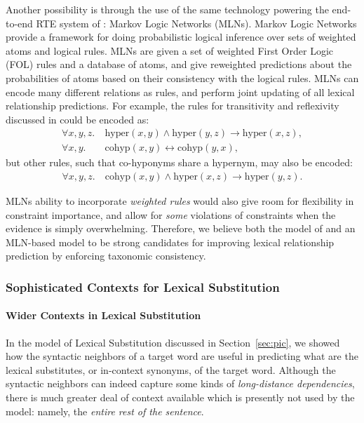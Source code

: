\documentclass[letterpaper]{article}
\begin{document}
Another possibility is through the use of the same technology powering the
end-to-end RTE system of : Markov Logic Networks
(MLNs).  Markov Logic Networks provide a framework for doing probabilistic
logical inference over sets of weighted atoms and logical rules. MLNs are given
a set of weighted First Order Logic (FOL) rules and a database of atoms, and
give reweighted predictions about the probabilities of atoms based on their
consistency with the logical rules. MLNs can encode many
different relations as rules, and perform joint updating of all lexical
relationship predictions.  For example, the rules for transitivity and reflexivity
discussed in  could be encoded as:
\begin{align*}
  \forall x,y,z. &~\text{hyper}(x,y) \wedge \text{hyper}(y, z) \rightarrow \text{hyper}(x, z),\\
  \forall x,y. &~\text{cohyp}(x,y) \leftrightarrow \text{cohyp}(y,x),
\end{align*}
but other rules, such that co-hyponyms share a hypernym, may also be encoded:
\begin{align*}
  \forall x,y,z. &~\text{cohyp}(x,y) \wedge \text{hyper}(x,z) \rightarrow \text{hyper}(y,z).
\end{align*}

MLNs ability to incorporate {\em weighted rules} would also give room for
flexibility in constraint importance, and allow for {\em some} violations of
constraints when the evidence is simply overwhelming. Therefore, we believe
both the model of  and an MLN-based model to be strong
candidates for improving lexical relationship prediction by enforcing taxonomic
consistency.

\subsubsection{Sophisticated Contexts for Lexical Substitution}

\paragraph{Wider Contexts in Lexical Substitution}
In the model of Lexical Substitution discussed in Section~\ref{sec:pic}, we
showed how the syntactic neighbors of a target word are useful in predicting
what are the lexical substitutes, or in-context synonyms, of the target word.
Although the syntactic neighbors can indeed capture some kinds of {\em long-distance
dependencies}, there is much greater deal of context available which is
presently not used by the model: namely, the {\em entire rest of the sentence}.
\end{document}
